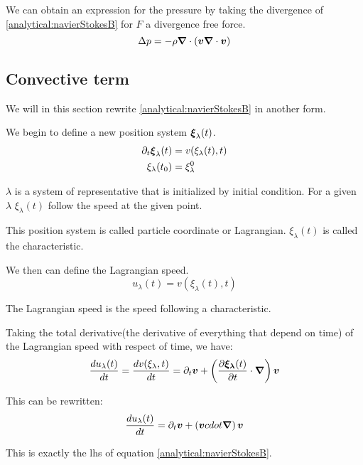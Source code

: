 We can obtain an expression for the pressure by taking the divergence of \ref{analytical:navierStokesB} for $F$ a divergence free force.
\begin{equation}
\label{analytical:pressure}
\Delta p=-\rho {\boldsymbol {\nabla}} \cdot ({\boldsymbol {v}}{\boldsymbol {\nabla}} \cdot {\boldsymbol {v}})
\end{equation}

\subsection{Convective term}
\label{analytical:convectif}
We will in this section rewrite \ref{analytical:navierStokesB} in another form.

We begin to define a new position system ${\boldsymbol {\xi}}_{\lambda}(t)$.
\begin{align}
 \partial_t {\boldsymbol {\xi}}_{\lambda}(t)&=v(\xi_{\lambda}(t),t)\\
 \xi_{\lambda}(t_0)&=\xi^{0}_{\lambda}
\end{align}

$\lambda$ is a system of representative that is initialized by initial condition.
For a given $\lambda$ $\xi_{\lambda}(t)$ follow the speed at the given point.

This position system is called particle coordinate or Lagrangian.
$\xi_\lambda(t)$ is called the characteristic.

We then can define the Lagrangian speed.
\begin{equation}
 u_{\lambda}(t)=v(\xi_{\lambda}(t),t)
\end{equation}

The Lagrangian speed is the speed following a characteristic.

Taking the total derivative(the derivative of everything that depend on time) of the Lagrangian speed with respect of time, we have:
\begin{equation}
\frac{d u_{\lambda}(t)}{d t}=\frac{d v(\xi_{\lambda},t)}{d t}=\partial_t {\boldsymbol {v}}+\left(\frac{\partial {\boldsymbol {\xi_{\lambda}}}(t)}{\partial t}\cdot{\boldsymbol {\nabla}}\right){\boldsymbol {v}}
\end{equation}

This can be rewritten:
\begin{equation}
\frac{d u_{\lambda}(t)}{d t}=\partial_t {\boldsymbol {v}}+\left({\boldsymbol {v}} cdot{\boldsymbol {\nabla}}\right){\boldsymbol {v}}
\end{equation}

This is exactly the lhs of equation \ref{analytical:navierStokesB}.

